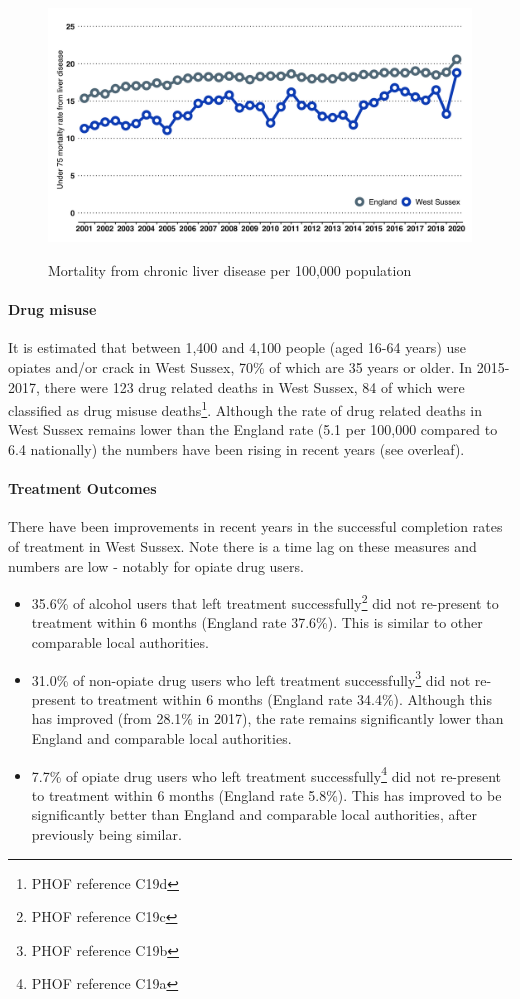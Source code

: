 \begin{figure}[htp]
    \caption{Mortality from chronic liver disease per 100,000 population}
    \centering
    \includegraphics[width=\linewidth]{images/u75_liver_line.png}
    \label{fig:u75_liver}
\end{figure}

\paragraph{Drug misuse} It is estimated that between 1,400 and 4,100 people (aged 16-64 years) use opiates and/or crack in West Sussex, 70\% of which are 35 years or older. In 2015-2017, there were 123 drug related deaths in West Sussex, 84 of which were classified as drug misuse deaths\footnote{PHOF reference C19d}. Although the rate of drug related deaths in West Sussex remains lower than the England rate (5.1 per 100,000 compared to 6.4 nationally) the numbers have been rising in recent years (see overleaf).

\paragraph{Treatment Outcomes}
There have been improvements in recent years in the successful completion rates of treatment in West Sussex. Note there is a time lag on these measures and numbers are low - notably for opiate drug users.

\begin{itemize}[noitemsep]
    \item 35.6\% of alcohol users that left treatment successfully\footnote{PHOF reference C19c} did not re-present to treatment within 6 months (England rate 37.6\%). This is similar to other comparable local authorities.
    \item 31.0\% of non-opiate drug users who left treatment successfully\footnote{PHOF reference C19b} did not re-present to treatment within 6 months (England rate 34.4\%). Although this has improved (from 28.1\% in 2017), the rate remains significantly lower than England and comparable local authorities.
    \item 7.7\% of opiate drug users who left treatment successfully\footnote{PHOF reference C19a} did not re-present to treatment within 6 months (England rate 5.8\%). This has improved to be significantly better than England and comparable local authorities, after previously being similar.
\end{itemize}


